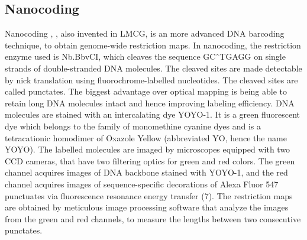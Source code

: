 \subsection*{Nanocoding}
Nanocoding \cite{Jo_etal_2007_PNAS}, \cite{Jo_etal_2009}, also invented in LMCG, is an more advanced DNA barcoding technique, to obtain genome-wide restriction maps. In nanocoding, the restriction enzyme used is Nb.BbvCI, which cleaves the sequence GC\^\ TGAGG on single strands of double-stranded DNA molecules. The cleaved sites are made detectable by nick translation using fluorochrome-labelled nucleotides. The cleaved sites are called punctates. The biggest advantage over optical mapping is being able to retain long DNA molecules intact and hence improving labeling efficiency. DNA molecules are stained with an intercalating dye YOYO-1. It is a green fluorescent dye which belongs to the family of monomethine cyanine dyes and is a tetracationic homodimer of Oxazole Yellow (abbreviated YO, hence the name YOYO). The labelled molecules are imaged by microscopes equipped with two CCD cameras, that have two filtering optics for green and red colors. The green channel acquires images of DNA backbone stained with YOYO-1, and the red channel acquires images of sequence-specific decorations of Alexa Fluor 547 punctuates via fluorescence resonance energy transfer (7). The restriction maps are obtained by meticulous image processing software that analyze the images from the green and red channels, to measure the lengths between two consecutive punctates.  \\

